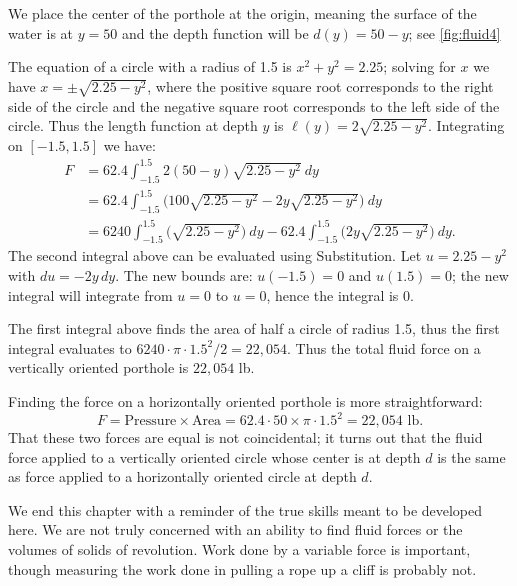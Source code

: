 {We place the center of the porthole at the origin, meaning the surface of the water is at $y=50$ and the depth function will be $d(y)=50-y$; see \autoref{fig:fluid4} 

The equation of a circle with a radius of 1.5 is $x^2+y^2=2.25$; solving for $x$ we have $x=\pm \sqrt{2.25-y^2}$, where the positive square root corresponds to the right side of the circle and the negative square root corresponds to the left side of the circle. Thus the length function at depth $y$ is $\ell(y) = 2\sqrt{2.25-y^2}$. Integrating on $[-1.5,1.5]$ we have:
\begin{align*}
	F
	&= 62.4\int_{-1.5}^{1.5} 2(50-y)\sqrt{2.25-y^2}\ dy \\
	&= 62.4\int_{-1.5}^{1.5} \big(100\sqrt{2.25-y^2} - 2y\sqrt{2.25-y^2}\big)\ dy \\
	&= 6240\int_{-1.5}^{1.5} \big(\sqrt{2.25-y^2}\big)\ dy - 62.4\int_{-1.5}^{1.5} \big(2y\sqrt{2.25-y^2}\big)\ dy.
\end{align*}			
The second integral above can be evaluated using Substitution. Let $u=2.25-y^2$ with $du = -2y\,dy$. The new bounds are: $u(-1.5)=0$ and $u(1.5)=0$; the new integral will integrate from $u=0$ to $u=0$, hence the integral is 0.

The first integral above finds the area of half a circle of radius 1.5, thus the first integral evaluates to $6240\cdot\pi\cdot1.5^2/2 = 22,054$. Thus the total fluid force on a vertically oriented porthole is $22,054$ lb.

Finding the force on a horizontally oriented porthole is more straightforward:
\[
F = \text{Pressure}\times\text{Area} = 62.4\cdot50\times \pi\cdot1.5^2
 = 22,054\text{ lb}.
\]
That these two forces are equal is not coincidental; it turns out that the fluid force applied to a vertically oriented circle whose center is at depth $d$ is the same as force applied to a horizontally oriented circle at depth $d$.}

We end this chapter with a reminder of the true skills meant to be developed here. We are not truly concerned with an ability to find fluid forces or the volumes of solids of revolution. Work done by a variable force is important, though measuring the work done in pulling a rope up a cliff is probably not.

